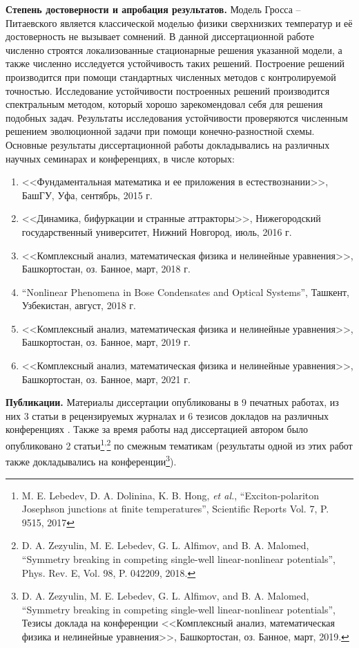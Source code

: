 \documentclass[candidate, href, colorlinks]{disser}
\begin{document}
\textbf{Степень достоверности и апробация результатов.}
Модель Гросса -- Питаевского является классической моделью физики сверхнизких температур и её достоверность не вызывает сомнений.
В данной диссертационной работе численно строятся локализованные стационарные решения указанной модели, а также численно исследуется устойчивость таких решений.
Построение решений производится при помощи стандартных численных методов с контролируемой точностью.
Исследование устойчивости построенных решений производится спектральным методом, который хорошо зарекомендовал себя для решения подобных задач.
Результаты исследования устойчивости проверяются численным решением эволюционной задачи при помощи конечно-разностной схемы.
Основные результаты диссертационной работы докладывались на различных научных семинарах и конференциях, в числе которых:
\begin{enumerate}
	\item <<Фундаментальная математика и ее приложения в естествознании>>, БашГУ, Уфа, сентябрь, 2015 г.
	\item <<Динамика, бифуркации и странные аттракторы>>, Нижегородский государственный университет, Нижний Новгород, июль, 2016 г.
	\item <<Комплексный анализ, математическая физика и нелинейные уравнения>>, Башкортостан, оз. Банное, март, 2018 г.
	\item ``Nonlinear Phenomena in Bose Condensates and Optical Systems'', Ташкент, Узбекистан, август, 2018 г.
	\item <<Комплексный анализ, математическая физика и нелинейные уравнения>>, Башкортостан, оз. Банное, март, 2019 г.
	\item <<Комплексный анализ, математическая физика и нелинейные уравнения>>, Башкортостан, оз. Банное, март, 2021 г.
\end{enumerate}

\textbf{Публикации.}
Материалы диссертации опубликованы в 9 печатных работах, из них 3 статьи в рецензируемых журналах \cite{AlfimovLebedev, LebedevAlfimovMalomed, AlfimovGegelLebedevMalomedZezyulin} и 6 тезисов докладов на различных конференциях \cite{Ufa2015, NizhniNovgorod2016, Bannoe2018, Tashkent2018, Bannoe2019, Bannoe2021}.
Также за время работы над диссертацией автором было опубликовано 2 статьи\footnote{M. E. Lebedev, D. A. Dolinina, K. B. Hong, {\it et al.}, ``Exciton-polariton Josephson junctions at finite temperatures'', Scientific Reports Vol. 7, P. 9515, 2017}\textsuperscript{,}\footnote{D. A. Zezyulin, M. E. Lebedev, G. L. Alfimov, and B. A. Malomed, ``Symmetry breaking in competing single-well linear-nonlinear potentials'', Phys. Rev. E, Vol. 98, P. 042209, 2018.} по смежным тематикам (результаты одной из этих работ также докладывались на конференции\footnote{D. A. Zezyulin, M. E. Lebedev, G. L. Alfimov, and B. A. Malomed, ``Symmetry breaking in competing single-well linear-nonlinear potentials'', Тезисы доклада на конференции <<Комплексный анализ, математическая физика и нелинейные уравнения>>, Башкортостан, оз. Банное, март, 2019.}).
\end{document}
